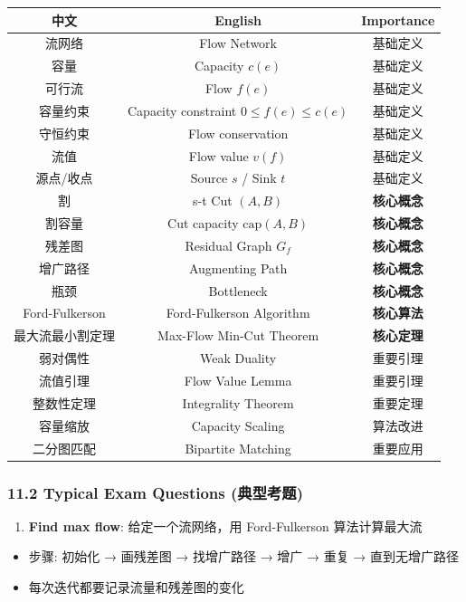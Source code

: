 \documentclass[10pt,a4paper,openany]{ctexbook}
\theoremstyle{definition}
\theoremstyle{remark}
\begin{document}
\begin{center}
\begin{tabular}{ccc}
\hline
中文 & English & Importance \\ \hline
流网络 & Flow Network & 基础定义 \\
容量 & Capacity $c(e)$ & 基础定义 \\
可行流 & Flow $f(e)$ & 基础定义 \\
容量约束 & Capacity constraint $0 \le f(e) \le c(e)$ & 基础定义 \\
守恒约束 & Flow conservation & 基础定义 \\
流值 & Flow value $v(f)$ & 基础定义 \\
源点/收点 & Source $s$ / Sink $t$ & 基础定义 \\
割 & s-t Cut $(A,B)$ & \textbf{核心概念} \\
割容量 & Cut capacity $\text{cap}(A,B)$ & \textbf{核心概念} \\
残差图 & Residual Graph $G_f$ & \textbf{核心概念} \\
增广路径 & Augmenting Path & \textbf{核心概念} \\
瓶颈 & Bottleneck & \textbf{核心概念} \\
Ford-Fulkerson & Ford-Fulkerson Algorithm & \textbf{核心算法} \\
最大流最小割定理 & Max-Flow Min-Cut Theorem & \textbf{核心定理} \\
弱对偶性 & Weak Duality & 重要引理 \\
流值引理 & Flow Value Lemma & 重要引理 \\
整数性定理 & Integrality Theorem & 重要定理 \\
容量缩放 & Capacity Scaling & 算法改进 \\
二分图匹配 & Bipartite Matching & 重要应用 \\
\hline
\end{tabular}

\end{center}

\subsubsection{11.2 Typical Exam Questions (典型考题)}

\begin{enumerate}
\item \textbf{Find max flow}: 给定一个流网络，用 Ford-Fulkerson 算法计算最大流
\end{enumerate}

\begin{itemize}
\item 步骤: 初始化 → 画残差图 → 找增广路径 → 增广 → 重复 → 直到无增广路径
\item 每次迭代都要记录流量和残差图的变化

\end{itemize}
\end{document}
